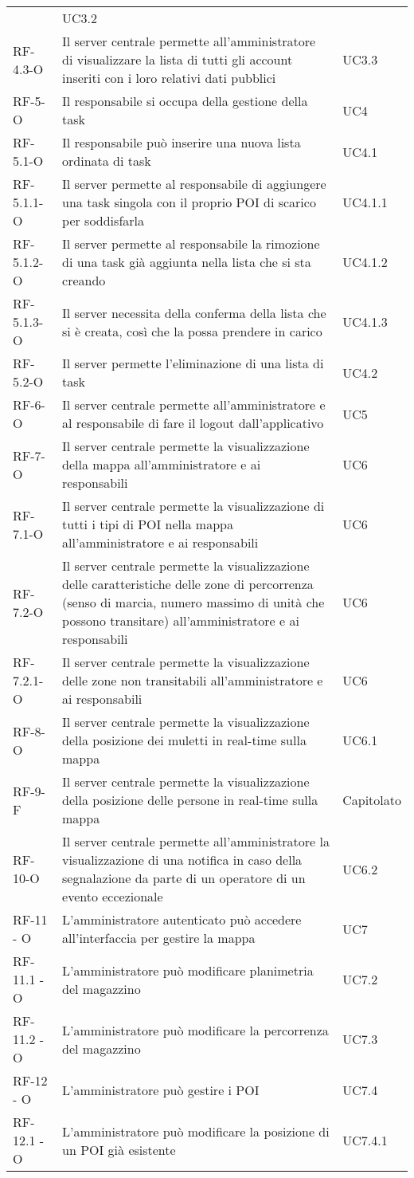 \begin{longtable}{ 
		>{}p{} 
		>{}p{}
		>{\centering}p{} }
&UC3.2
\tabularnewline
RF-4.3-O&
Il server centrale permette all'amministratore di visualizzare la lista di tutti gli account inseriti con i loro relativi dati pubblici
&UC3.3
\tabularnewline
RF-5-O&
Il responsabile si occupa della gestione della task
&UC4
\tabularnewline
RF-5.1-O&
Il responsabile può inserire una nuova lista ordinata di task
&UC4.1
\tabularnewline
RF-5.1.1-O&
Il server permette al responsabile di aggiungere una task singola con il proprio POI di scarico per soddisfarla
&UC4.1.1
\tabularnewline
RF-5.1.2-O&
Il server permette al responsabile la rimozione di una task già aggiunta nella lista che si sta creando
&UC4.1.2
\tabularnewline
RF-5.1.3-O&
Il server necessita della conferma della lista che si è creata, così che la possa prendere in carico
&UC4.1.3
\tabularnewline
RF-5.2-O&
Il server permette l'eliminazione di una lista di task
&UC4.2
\tabularnewline
RF-6-O&
Il server centrale permette all'amministratore e al responsabile di fare il logout dall'applicativo
&UC5
\tabularnewline
RF-7-O&
Il server centrale permette la visualizzazione della mappa all’amministratore e ai responsabili
&UC6
\tabularnewline
RF-7.1-O&
Il server centrale permette la visualizzazione di tutti i tipi di POI nella mappa all'amministratore e ai responsabili
&UC6
\tabularnewline
RF-7.2-O&
Il server centrale permette la visualizzazione delle caratteristiche delle zone di percorrenza (senso di marcia, numero massimo di unità che possono transitare) all’amministratore e ai responsabili
&UC6
\tabularnewline
RF-7.2.1-O&
Il server centrale permette la visualizzazione delle zone non transitabili all’amministratore e ai responsabili
&UC6
\tabularnewline
RF-8-O&
Il server centrale permette la visualizzazione della posizione dei muletti in real-time sulla mappa
&UC6.1
\tabularnewline
RF-9-F&
Il server centrale permette la visualizzazione della posizione delle persone in real-time sulla mappa
&Capitolato
\tabularnewline
RF-10-O&
Il server centrale permette all'amministratore la visualizzazione di una notifica in caso della segnalazione da parte di un operatore di un evento eccezionale
&
UC6.2
\tabularnewline
RF-11
-
O
&
L’amministratore autenticato può accedere all’interfaccia per gestire la mappa
&
UC7
\tabularnewline
RF-11.1
-
O
&
L’amministratore può modificare planimetria del magazzino
&
UC7.2
\tabularnewline
RF-11.2
-
O
&
L’amministratore può modificare la percorrenza del magazzino
&
UC7.3
\tabularnewline
RF-12
-
O
&
L’amministratore può gestire i POI
&
UC7.4
\tabularnewline
RF-12.1
-
O
&
L'amministratore può modificare la posizione di un POI già esistente
&
UC7.4.1
\tabularnewline

\end{longtable}
